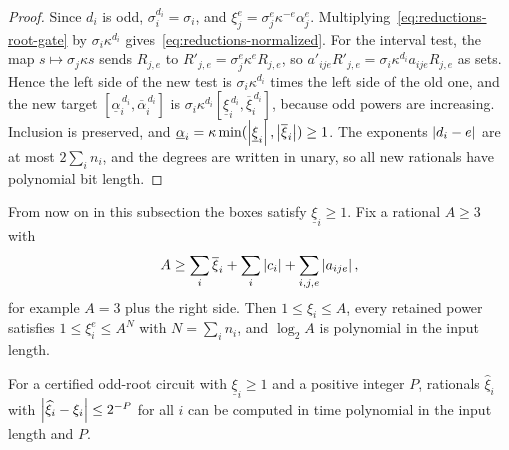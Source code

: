 \begin{proof}
Since $d_i$ is odd, $\sigma_i^{d_i}=\sigma_i$, and
$\xi_j^e=\sigma_j^e\kappa^{-e}\alpha_j^e$. Multiplying~\eqref{eq:reductions-root-gate}
by $\sigma_i\kappa^{d_i}$ gives~\eqref{eq:reductions-normalized}. For the
interval test, the map $s\mapsto\sigma_j\kappa s$ sends $R_{j,e}$ to
$R'_{j,e}=\sigma_j^e\kappa^eR_{j,e}$, so
$a'_{ije}R'_{j,e}=\sigma_i\kappa^{d_i}a_{ije}R_{j,e}$ as sets. Hence the left side
of the new test is $\sigma_i\kappa^{d_i}$ times the left side of the old one,
and the new target $[\underline\alpha_i^{\,d_i},\overline\alpha_i^{\,d_i}]$ is
$\sigma_i\kappa^{d_i}[\underline\xi_i^{\,d_i},\overline\xi_i^{\,d_i}]$, because odd
powers are increasing. Inclusion is preserved, and
$\underline\alpha_i=\kappa\min(\left\lvert\underline\xi_i\right\rvert,\left\lvert\overline\xi_i\right\rvert)\ge1$.
The exponents $\left\lvert d_i-e\right\rvert$ are at most $2\sum_in_i$, and the degrees are
written in unary, so all new rationals have polynomial bit length.
\end{proof}

From now on in this subsection the boxes satisfy $\underline\xi_i\ge1$. Fix a
rational $A\ge3$ with
\begin{equation}
 A\ge\sum_i\overline\xi_i+\sum_i\left\lvert c_i\right\rvert+\sum_{i,j,e}\left\lvert a_{ije}\right\rvert,
 \label{eq:reductions-A}
\end{equation}
for example $A=3$ plus the right side. Then $1\le\xi_i\le A$, every retained
power satisfies $1\le\xi_i^e\le A^N$ with $N=\sum_in_i$, and $\log_2A$ is polynomial
in the input length.

\begin{lemma}
\label{lem:reductions-root-approx}
For a certified odd-root circuit with $\underline\xi_i\ge1$ and a positive
integer $P$, rationals $\widehat\xi_i$ with $\left\lvert\widehat\xi_i-\xi_i\right\rvert\le2^{-P}$
for all $i$ can be computed in time polynomial in the input length and $P$.
\end{lemma}

